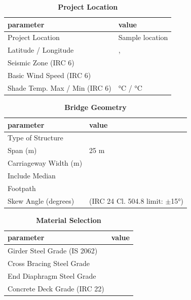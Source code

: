 \documentclass[12pt,a4paper]{report}
\numberwithin{table}{chapter}
\numberwithin{figure}{chapter}
\begin{document}
\begin{table}[H]
\caption{\textbf{Project Location}}
\label{subsec:project-location}
\begin{tabular}{|L{5.5cm}|L{8.5cm}|}
\hline
\textbf{parameter} & \textbf{value} \\
\hline
\textnormal{Project Location} & Sample location \\
\hline
\textnormal{Latitude / Longitude} & ,  \\
\hline
\textnormal{Seismic Zone (IRC 6)} &  \\
\hline
\textnormal{Basic Wind Speed (IRC 6)} &  \\
\hline
\textnormal{Shade Temp. Max / Min (IRC 6)} &  °C /  °C \\
\hline
\end{tabular}
\vspace{0.4cm}
\end{table}

\begin{table}[H]
\caption{\textbf{Bridge Geometry}}
\label{subsec:bridge-geometry}
\begin{tabular}{|L{5.5cm}|L{8.5cm}|}
\hline
\textbf{parameter} & \textbf{value} \\
\hline
\textnormal{Type of Structure} &  \\
\hline
\textnormal{Span (m)} & 25 m \\
\hline
\textnormal{Carriageway Width (m)} &  \\
\hline
\textnormal{Include Median} &  \\
\hline
\textnormal{Footpath} &  \\
\hline
\textnormal{Skew Angle (degrees)} &  (IRC 24 Cl. 504.8 limit: $\pm$15°) \\
\hline
\end{tabular}
\end{table}
\vspace{0.4cm}

\begin{table}[H]
\caption{\textbf{Material Selection}}
\label{subsec:material}
\begin{tabular}{|L{5.5cm}|L{8.5cm}|}
\hline
\textbf{parameter} & \textbf{value} \\
\hline
\textnormal{Girder Steel Grade (IS 2062)} &  \\
\hline
\textnormal{Cross Bracing Steel Grade} &  \\
\hline
\textnormal{End Diaphragm Steel Grade} &  \\
\hline
\textnormal{Concrete Deck Grade (IRC 22)} &  \\
\hline
\end{tabular}
\end{table}
\vspace{0.4cm}
\end{document}

